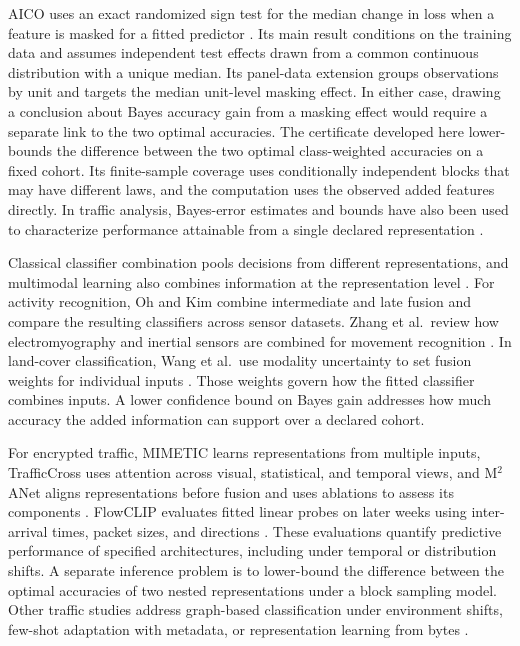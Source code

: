\documentclass[preprint,11pt]{elsarticle}
\begin{document}
AICO uses an exact randomized sign test for the median change in loss when a feature is masked for a fitted predictor \cite{giesecke2026aico}. Its main result conditions on the training data and assumes independent test effects drawn from a common continuous distribution with a unique median. Its panel-data extension groups observations by unit and targets the median unit-level masking effect. In either case, drawing a conclusion about Bayes accuracy gain from a masking effect would require a separate link to the two optimal accuracies. The certificate developed here lower-bounds the difference between the two optimal class-weighted accuracies on a fixed cohort. Its finite-sample coverage uses conditionally independent blocks that may have different laws, and the computation uses the observed added features directly. In traffic analysis, Bayes-error estimates and bounds have also been used to characterize performance attainable from a single declared representation \cite{cherubin2017bayes,cherubin2019fbleau}.

Classical classifier combination pools decisions from different representations, and multimodal learning also combines information at the representation level \cite{kittler1998combining,baltrusaitis2019multimodal}. For activity recognition, Oh and Kim combine intermediate and late fusion and compare the resulting classifiers across sensor datasets. Zhang et al.\ review how electromyography and inertial sensors are combined for movement recognition \cite{oh2024lifelog,zhang2026semgimu}. In land-cover classification, Wang et al.\ use modality uncertainty to set fusion weights for individual inputs \cite{wang2025udfnet}. Those weights govern how the fitted classifier combines inputs. A lower confidence bound on Bayes gain addresses how much accuracy the added information can support over a declared cohort.

For encrypted traffic, MIMETIC learns representations from multiple inputs, TrafficCross uses attention across visual, statistical, and temporal views, and M$^2$ANet aligns representations before fusion and uses ablations to assess its components \cite{aceto2019mimetic,zuo2026trafficcross,huang2027m2anet}. FlowCLIP evaluates fitted linear probes on later weeks using inter-arrival times, packet sizes, and directions \cite{choi2026flowclip}. These evaluations quantify predictive performance of specified architectures, including under temporal or distribution shifts. A separate inference problem is to lower-bound the difference between the optimal accuracies of two nested representations under a block sampling model. Other traffic studies address graph-based classification under environment shifts, few-shot adaptation with metadata, or representation learning from bytes \cite{cui2025fgsat,gunasekara2026geta,kulatilleke2026mambanetburst}.
\end{document}
